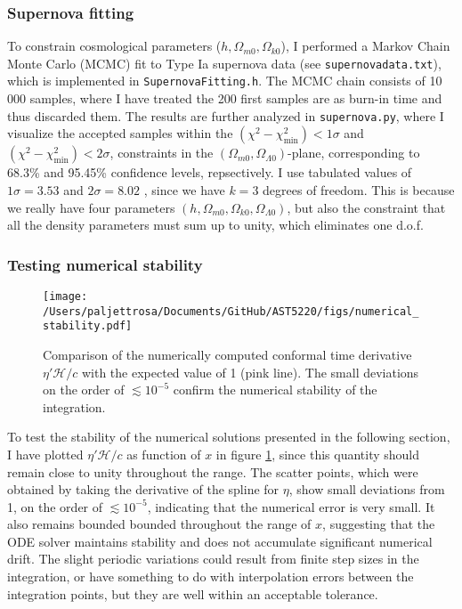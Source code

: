 \documentclass{aa}
\numberwithin{equation}{section}
\numberwithin{table}{section}
\numberwithin{figure}{section}
\begin{document}
\subsubsection{Supernova fitting}
To constrain cosmological parameters ($h, \Omega_{m0}, \Omega_{k0}$), I performed a Markov Chain Monte Carlo (MCMC) fit to Type Ia supernova data (see \verb|supernovadata.txt|), which is implemented in \verb|SupernovaFitting.h|. The MCMC chain consists of 10$\,$000 samples, where I have treated the 200 first samples are as burn-in time and thus discarded them. The results are further analyzed in \verb|supernova.py|, where I visualize the accepted samples within the $(\chi^2-\chi^2_\text{min})<1\sigma$ and $(\chi^2-\chi^2_\text{min})<2\sigma$, constraints in the $(\Omega_{m0},\Omega_{\Lambda0})$-plane, corresponding to 68.3\% and 95.45\% confidence levels, repsectively. I use tabulated values of $1\sigma=3.53$ and $2\sigma=8.02$ \citep[see][]{Chi2}, since we have $k=3$ degrees of freedom. This is because we really have four parameters $(h, \Omega_{m0}, \Omega_{k0}, \Omega_{\Lambda0})$, but also the constraint that all the density parameters must sum up to unity, which eliminates one d.o.f. 

\subsubsection{Testing numerical stability}
\begin{figure}
    \centering
    \texttt{[image: /Users/paljettrosa/Documents/GitHub/AST5220/figs/numerical\_stability.pdf]}
    \caption{Comparison of the numerically computed conformal time derivative  $\eta'\mathcal{H}/c$ with the expected value of 1 (pink line). The small deviations on the order of $\lesssim 10^{-5}$ confirm the numerical stability of the integration.}\label{fig:numerical stability}
\end{figure}

To test the stability of the numerical solutions presented in the following section, I have plotted $\eta'\mathcal{H}/c$ as function of $x$ in figure \ref{fig:numerical stability}, since this quantity should remain close to unity throughout the range. The scatter points, which were obtained by taking the derivative of the spline for $\eta$, show small deviations from 1, on the order of $\lesssim 10^{-5}$, indicating that the numerical error is very small. It also remains bounded bounded throughout the range of $x$, suggesting that the ODE solver maintains stability and does not accumulate significant numerical drift. The slight periodic variations could result from finite step sizes in the integration, or have something to do with interpolation errors between the integration points, but they are well within an acceptable tolerance.
\end{document}
